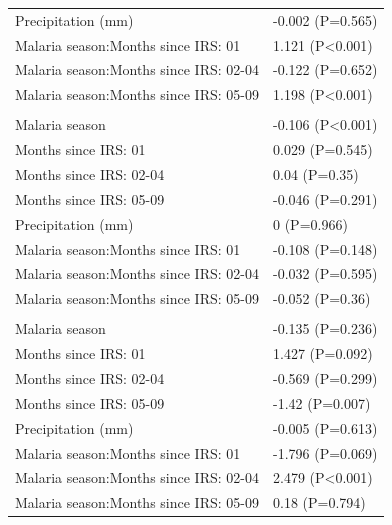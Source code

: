 \documentclass[]{article}
\begin{document}
\begin{table}
\begin{tabular}[t]{ll}
\hspace{1em}Precipitation (mm) & -0.002 (P=0.565)\\
\hspace{1em}Malaria season:Months since IRS: 01 & 1.121 (P<0.001)\\
\hspace{1em}Malaria season:Months since IRS: 02-04 & -0.122 (P=0.652)\\
\hspace{1em}Malaria season:Months since IRS: 05-09 & 1.198 (P<0.001)\\
\addlinespace[1.5em]
\multicolumn{2}{l}{\textbf{Temporary field worker}}\\
\hspace{1em}Malaria season & -0.106 (P<0.001)\\
\hspace{1em}Months since IRS: 01 & 0.029 (P=0.545)\\
\hspace{1em}Months since IRS: 02-04 & 0.04 (P=0.35)\\
\hspace{1em}Months since IRS: 05-09 & -0.046 (P=0.291)\\
\hspace{1em}Precipitation (mm) & 0 (P=0.966)\\
\hspace{1em}Malaria season:Months since IRS: 01 & -0.108 (P=0.148)\\
\hspace{1em}Malaria season:Months since IRS: 02-04 & -0.032 (P=0.595)\\
\hspace{1em}Malaria season:Months since IRS: 05-09 & -0.052 (P=0.36)\\
\addlinespace[1.5em]
\multicolumn{2}{l}{\textbf{Temporary not field worker}}\\
\hspace{1em}Malaria season & -0.135 (P=0.236)\\
\hspace{1em}Months since IRS: 01 & 1.427 (P=0.092)\\
\hspace{1em}Months since IRS: 02-04 & -0.569 (P=0.299)\\
\hspace{1em}Months since IRS: 05-09 & -1.42 (P=0.007)\\
\hspace{1em}Precipitation (mm) & -0.005 (P=0.613)\\
\hspace{1em}Malaria season:Months since IRS: 01 & -1.796 (P=0.069)\\
\hspace{1em}Malaria season:Months since IRS: 02-04 & 2.479 (P<0.001)\\
\hspace{1em}Malaria season:Months since IRS: 05-09 & 0.18 (P=0.794)\\
\bottomrule
\end{tabular}
\end{table}
\end{document}
